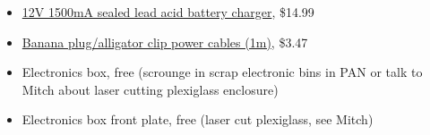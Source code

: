\documentclass[letterpaper,12pt]{article}
\begin{document}
\begin{itemize}
{}
\item{\href{https://www.amazon.com/Alligator-Pop-Time-Approved-Qualified/dp/B01IGSDSF6/ref=sr_1_9?ie=UTF8&qid=1516318913&sr=8-9&keywords=12v+battery+clips}{12V 1500mA sealed lead acid battery charger}, \$14.99
}
\item{\href{https://www.amazon.com/Test-Cable-TOOGOO-Alligator-Multimeter/dp/B01GO4PZDW/ref=sr_1_5?ie=UTF8&qid=1517497220&sr=8-5&keywords=banana+plugs+alligator+clips}{Banana plug/alligator clip power cables (1m)}, \$3.47
}
\item{Electronics box, free (scrounge in scrap electronic bins in PAN or talk to Mitch about laser cutting plexiglass enclosure)
}
\item{Electronics box front plate, free (laser cut plexiglass, see Mitch)
}
\end{itemize}
\end{document}
